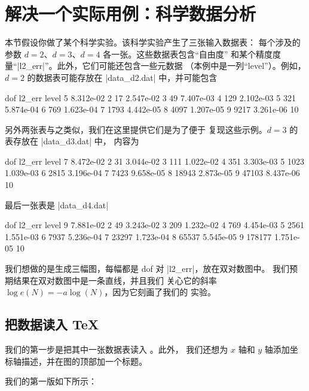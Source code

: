 \section{解决一个实际用例：科学数据分析}

本节假设你做了某个科学实验。该科学实验产生了三张输入数据表：
每个涉及的参数 $d=2$、$d=3$、$d=4$ 各一张。这些数据表包含“自由度”
和某个精度度量“|l2_err|”。此外，它们可能还包含一些元数据
（本例中是一列“level”）。例如，$d=2$ 的数据表可能存放在
|data_d2.dat| 中，并可能包含
%
\begin{codeexample}
dof        l2_err     level
5          8.312e-02  2
17         2.547e-02  3
49         7.407e-03  4
129        2.102e-03  5
321        5.874e-04  6
769        1.623e-04  7
1793       4.442e-05  8
4097       1.207e-05  9
9217       3.261e-06  10
\end{codeexample}
%
另外两张表与之类似，我们在这里提供它们是为了便于
复现这些示例。$d=3$ 的表存放在 |data_d3.dat| 中，
内容为
%
\begin{codeexample}
dof        l2_err     level
7          8.472e-02  2
31         3.044e-02  3
111        1.022e-02  4
351        3.303e-03  5
1023       1.039e-03  6
2815       3.196e-04  7
7423       9.658e-05  8
18943      2.873e-05  9
47103      8.437e-06  10
\end{codeexample}
%
最后一张表是 |data_d4.dat|
%
\begin{codeexample}
dof        l2_err     level
9          7.881e-02  2
49         3.243e-02  3
209        1.232e-02  4
769        4.454e-03  5
2561       1.551e-03  6
7937       5.236e-04  7
23297      1.723e-04  8
65537      5.545e-05  9
178177     1.751e-05  10
\end{codeexample}

我们想做的是生成三幅图，每幅都是 dof 对 |l2_err|，放在双对数图中。
我们预期结果在双对数图中是一条直线，并且我们
关心它的斜率 $\log e(N) = -a \log(N)$，因为它刻画了我们的
实验。


\subsection{把数据读入 \TeX{}}
\label{sec:tut2:step1}

我们的第一步是把其中一张数据表读入 \PGFPlots{}。此外，
我们还想为 $x$ 轴和 $y$ 轴添加坐标轴描述，并在图的顶部加一个标题。

我们的第一版如下所示：
%
\begin{codeexample}[]

%


%
\end{codeexample}

